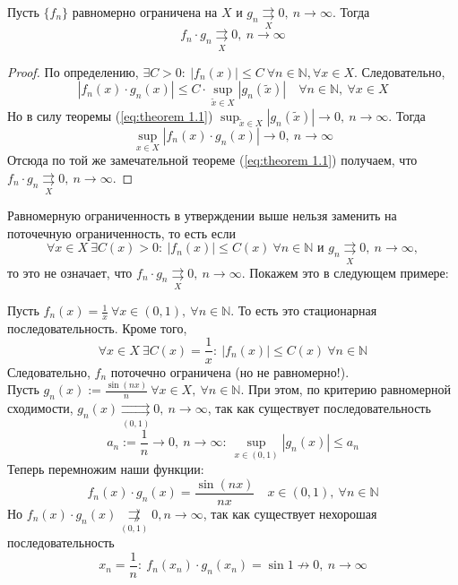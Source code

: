 \documentclass[11pt]{article}
\begin{document}
\begin{statement}
    Пусть $\{f_n\}$ равномерно ограничена на $X$ и $g_n \underset{X}{\rightrightarrows} 0, \ n \to \infty$. Тогда \[f_n \cdot g_n \underset{X}{\rightrightarrows} 0, \ n \to \infty\]
\end{statement}

\begin{proof}
    По определению, $\exists C > 0: \ |f_n(x)| \leq C \ \forall n \in \mathbb{N}, \forall x \in X$. Следовательно, \[|f_n(x) \cdot g_n(x)| \leq C \cdot \sup_{\widetilde{x} \in X}
    |g_n(\widetilde{x})| \quad \forall n \in \mathbb{N}, \ \forall x \in X\]
    Но в силу теоремы (\ref{eq:theorem 1.1}) $\displaystyle \sup_{\widetilde{x} \in X} |g_n(\widetilde{x})| \to 0, \ n \to \infty$. Тогда \[\sup_{x \in X}
    |f_n(x) \cdot g_n(x)| \to 0, \ n \to \infty\] Отсюда по той же замечательной теореме (\ref{eq:theorem 1.1}) получаем, что $f_n \cdot g_n \underset{X}{\rightrightarrows} 0, \ n \to \infty$.
\end{proof}

\begin{remark}
    Равномерную ограниченность в утверждении выше нельзя заменить на поточечную ограниченность, то есть если \[\forall x \in X \ \exists C(x) > 0: \ |f_n(x)| \leq C(x) \ \forall 
    n \in \mathbb{N} \text{ и } g_n \underset{X}{\rightrightarrows} 0, \ n \to \infty,\] то это не означает, что $f_n \cdot g_n \underset{X}{\rightrightarrows} 0, \ n \to \infty$.
    Покажем это в следующем примере:
\end{remark}

\begin{example}
    Пусть $f_n(x) = \displaystyle \frac{1}{x} \ \forall x \in \left(0, 1\right), \ \forall n \in \mathbb{N}$. То есть это стационарная последовательность. Кроме того,
    \[\forall x \in X \ \exists C(x) = \frac{1}{x}: \ |f_n(x)| \leq C(x) \ \forall n \in \mathbb{N}\] Следовательно, $f_n$ поточечно ограничена (но не равномерно!).\\
    Пусть $\displaystyle g_n(x) := \frac{\sin(nx)}{n} \ \forall x \in X, \ 
    \forall n \in \mathbb{N}$. При этом, по критерию равномерной сходимости, $\displaystyle g_n(x) \underset{(0, 1)}{\rightrightarrows} 0, \ n \to \infty$, так как существует 
    последовательность \[a_n := \frac{1}{n} \to 0, \ n \to \infty: \ \sup_{x \in (0, 1)} |g_n(x)| \leq a_n\] Теперь перемножим наши функции: \[f_n(x) \cdot g_n(x) = 
    \frac{\sin(nx)}{nx} \quad x \in (0, 1), \ \forall n \in \mathbb{N}\] Но $\displaystyle f_n(x) \cdot g_n(x) \underset{(0, 1)}{\not\rightrightarrows} 0, n \to \infty$, так 
    как существует нехорошая последовательность \[x_n = \frac{1}{n}: \ f_n(x_n) \cdot g_n(x_n) = \sin 1 \not\to 0, \ n \to \infty\] 
\end{example}
\end{document}
